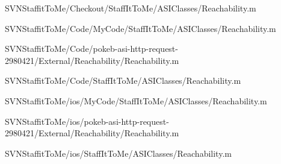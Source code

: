 \begin{DoxyCompactItemize}
\-S\-V\-N\-Staffit\-To\-Me/\-Checkout/\-Staff\-It\-To\-Me/\-A\-S\-I\-Classes/\-Reachability.\-m\item 
\-S\-V\-N\-Staffit\-To\-Me/\-Code/\-My\-Code/\-Staff\-It\-To\-Me/\-A\-S\-I\-Classes/\-Reachability.\-m\item 
\-S\-V\-N\-Staffit\-To\-Me/\-Code/pokeb-\/asi-\/http-\/request-\/2980421/\-External/\-Reachability/\-Reachability.\-m\item 
\-S\-V\-N\-Staffit\-To\-Me/\-Code/\-Staff\-It\-To\-Me/\-A\-S\-I\-Classes/\-Reachability.\-m\item 
\-S\-V\-N\-Staffit\-To\-Me/ios/\-My\-Code/\-Staff\-It\-To\-Me/\-A\-S\-I\-Classes/\-Reachability.\-m\item 
\-S\-V\-N\-Staffit\-To\-Me/ios/pokeb-\/asi-\/http-\/request-\/2980421/\-External/\-Reachability/\-Reachability.\-m\item 
\-S\-V\-N\-Staffit\-To\-Me/ios/\-Staff\-It\-To\-Me/\-A\-S\-I\-Classes/\-Reachability.\-m\end{DoxyCompactItemize}
